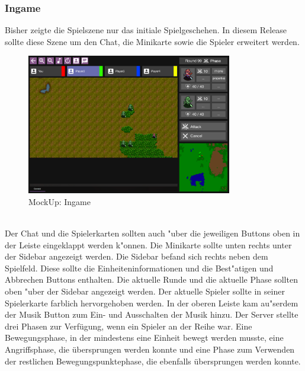 \documentclass[12pt, titlepage]{scrartcl}
\newcounter{subsubsubsection}[subsubsection]
\begin{document}
		    \subsubsection{Ingame}
		        Bisher zeigte die Spielszene nur das initiale Spielgeschehen. In diesem Release sollte diese Szene um den Chat, die Minikarte sowie die Spieler erweitert werden. \\
		        \begin{figure}[H] 
    				\centering
    				\includegraphics[width=0.8\textwidth]{images/mockUps/Ingame.png}
    				\caption{MockUp: Ingame}
    				\label{Ingame_View}
			    \end{figure}
		    	\ \\   Der Chat und die Spielerkarten sollten auch "uber die jeweiligen Buttons oben in der Leiste eingeklappt werden k"onnen. Die Minikarte sollte unten rechts unter der Sidebar angezeigt werden. Die Sidebar befand sich rechts neben dem Spielfeld. Diese sollte die Einheiteninformationen und die Best"atigen und Abbrechen Buttons enthalten. Die aktuelle Runde und die aktuelle Phase sollten oben "uber der Sidebar angezeigt werden. Der aktuelle Spieler sollte in seiner Spielerkarte farblich hervorgehoben werden. In der oberen Leiste kam au"serdem der Musik Button zum Ein- und Ausschalten der Musik hinzu.
			        Der Server stellte drei Phasen zur Verf\"ugung, wenn ein Spieler an der Reihe war. Eine Bewegungsphase, in der mindestens eine Einheit bewegt werden musste, eine Angriffsphase, die \"ubersprungen werden konnte und eine Phase zum Verwenden der restlichen Bewegungspunktephase, die ebenfalls \"ubersprungen werden konnte. \\
\end{document}
